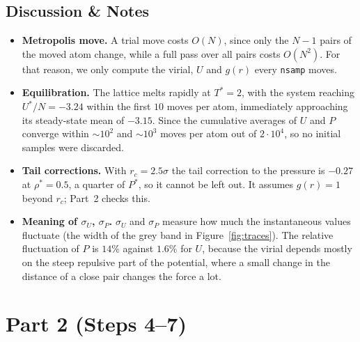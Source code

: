 \subsection{Discussion \& Notes}
\begin{itemize}
  \item \textbf{Metropolis move.} A trial move costs $O(N)$, since only the $N-1$ pairs of the moved atom change, while a full pass over all pairs costs $O(N^2)$. For that reason, we only compute the virial, $U$ and $g(r)$ every \texttt{nsamp} moves.

  \item \textbf{Equilibration.} The lattice melts rapidly at $T^* = 2$, with the system reaching $U^*/N = -3.24$ within the first $10$ moves per atom, immediately approaching its steady-state mean of $-3.15$. Since the cumulative averages of $U$ and $P$ converge within $\sim 10^2$ and $\sim 10^3$ moves per atom out of $2 \cdot 10^4$, so no initial samples were discarded.

  \item \textbf{Tail corrections.} With $r_c=2.5\sigma$ the tail correction to the pressure is $-0.27$ at $\rho^*=0.5$, a quarter of $P^*$, so it cannot be left out. It assumes $g(r)=1$ beyond $r_c$; Part~2 checks this.

  \item \textbf{Meaning of $\sigma_U$, $\sigma_P$.} $\sigma_U$ and $\sigma_P$ measure how much the instantaneous values fluctuate (the width of the grey band in Figure~\ref{fig:traces}). The relative fluctuation of $P$ is $14\%$ against $1.6\%$ for $U$, because the virial depends mostly on the steep repulsive part of the potential, where a small change in the distance of a close pair changes the force a lot.
\end{itemize}

\newpage
\section{Part 2 (Steps 4--7)}

